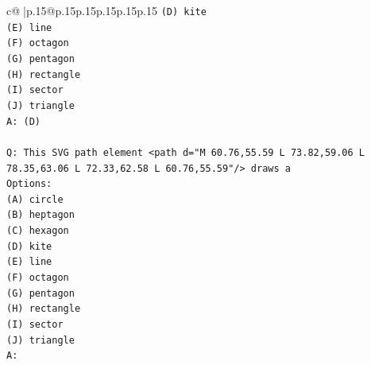 \documentclass{article}
\begin{document}
{\begin{supertabular}{c@{$\;$}|p{.15\linewidth}@{}p{.15\linewidth}p{.15\linewidth}p{.15\linewidth}p{.15\linewidth}p{.15\linewidth}}
{{{\texttt{(D) kite} \\
\texttt{(E) line} \\
\texttt{(F) octagon} \\
\texttt{(G) pentagon} \\
\texttt{(H) rectangle} \\
\texttt{(I) sector} \\
\texttt{(J) triangle} \\
\texttt{A: (D)} \\
\\ 
\texttt{Q: This SVG path element <path d="M 60.76,55.59 L 73.82,59.06 L 78.35,63.06 L 72.33,62.58 L 60.76,55.59"/> draws a} \\
\texttt{Options:} \\
\texttt{(A) circle} \\
\texttt{(B) heptagon} \\
\texttt{(C) hexagon} \\
\texttt{(D) kite} \\
\texttt{(E) line} \\
\texttt{(F) octagon} \\
\texttt{(G) pentagon} \\
\texttt{(H) rectangle} \\
\texttt{(I) sector} \\
\texttt{(J) triangle} \\
\texttt{A:} \\
            }
        }
    }
     \\ \\


\end{supertabular}}
\end{document}
